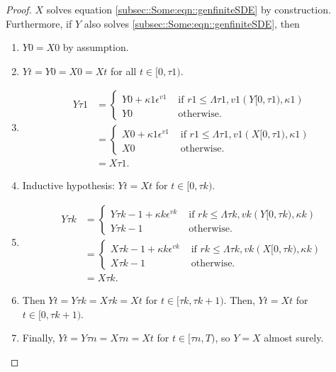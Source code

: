 \documentclass[12pt]{article}
\newcommand{\te}{\text}
\newcommand{\ep}{\epsilon}
\renewcommand{\v}{v}							%
\newcommand{\ev}{\ep}							%
\newcommand{\T}{T}								%
\renewcommand{\t}{t}							%
\newcommand{\X}{X}								%
\newcommand{\vind}[1]{^{#1}}					%
\renewcommand{\r}{r}							%
\newcommand{\XX}{Y}								%
\newcommand{\rt}{\tau}							%
\renewcommand{\it}{k}							%
\renewcommand{\mark}{\kappa}					%
\newcommand{\ratee}{\Lambda}					%
\begin{document}
\begin{proof}
\(\X{}{}\) solves equation \eqref{subsec::Some:eqn::genfiniteSDE} by construction. Furthermore, if \(\XX{}{}\) also solves \eqref{subsec::Some:eqn::genfiniteSDE}, then 

\begin{enumerate}
\item \(\XX{}{0} = \X{}{0}\) by assumption.

\item \(\XX{}{\t} = \XX{}{0} = \X{}{0} = \X{}{\t}\) for all \(\t\in [0,\rt{1})\).

\item 

\begin{align*}
\XX{}{\rt{1}} &= \begin{cases}
\XX{}{0} + \mark{1}\ev\vind{\v{1}} &\te{ if } \r{1} \leq \ratee{\rt{1},\v{1}}(\XX{}{[0,\rt{1})},\mark{1})\\
\XX{}{0} &\te{ otherwise.}
\end{cases}\\
&= \begin{cases}
\X{}{0} + \mark{1}\ev\vind{\v{1}} &\te{ if } \r{1} \leq \ratee{\rt{1},\v{1}}(\X{}{[0,\rt{1})},\mark{1})\\
\X{}{0} &\te{ otherwise.}
\end{cases}\\
&= \X{}{\rt{1}}.
\end{align*}

\item Inductive hypothesis: \(\XX{}{\t} = \X{}{\t}\) for \(\t\in [0,\rt{\it})\). 

\item 

\begin{align*}
\XX{}{\rt{\it}} &= \begin{cases}
\XX{}{\rt{\it-1}} + \mark{\it}\ev\vind{\v{\it}} &\te{ if } \r{\it} \leq \ratee{\rt{\it},\v{\it}}(\XX{}{[0,\rt{\it})},\mark{\it})\\
\XX{}{\rt{\it-1}} &\te{ otherwise.}
\end{cases}\\
&= \begin{cases}
\X{}{\rt{\it-1}} + \mark{\it}\ev\vind{\v{\it}} &\te{ if } \r{\it} \leq \ratee{\rt{\it},\v{\it}}(\X{}{[0,\rt{\it})},\mark{\it})\\
\X{}{\rt{\it-1}} &\te{ otherwise.}
\end{cases}\\
&= \X{}{\rt{\it}}.
\end{align*}

\item Then \(\XX{}{\t} = \XX{}{\rt{\it}} = \X{}{\rt{\it}} = \X{}{\t}\) for \(\t \in [\rt{\it},\rt{\it+1})\). Then, \(\XX{}{\t} = \X{}{\t}\) for \(\t\in [0,\rt{\it+1})\).

\item Finally, \(\XX{}{\t} = \XX{}{\rt{n}} = \X{}{\rt{n}} = \X{}{\t}\) for \(\t\in [\rt{n},\T)\), so \(\XX{}{} = \X{}{}\) almost surely.
\end{enumerate}
\end{proof}
\end{document}
